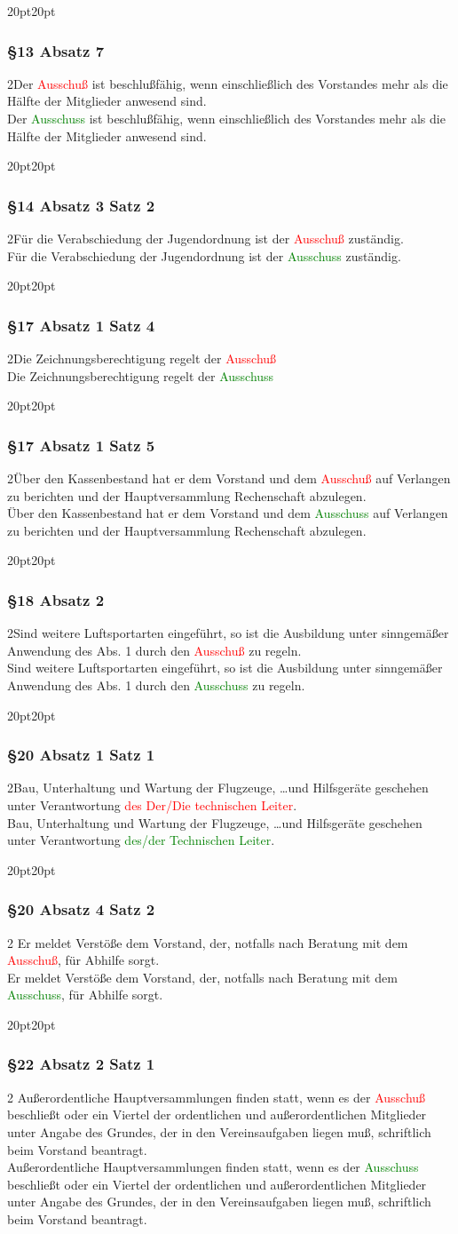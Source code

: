 \documentclass[10pt,a4paper,parskip=half]{scrartcl}
\newcommand{\new}[1]{\textcolor{Green}{#1}}
\newcommand{\old}[1]{\textcolor{Red}{#1}}
\newcommand{\change}[1]{
  \begin{adjustwidth}{20pt}{20pt}
    #1
  \end{adjustwidth}
}
\newcommand{\compare}[3]{\change{\subsubsection*{#1}\begin{multicols}{2}#2\columnbreak\\#3\end{multicols}}}
\begin{document}
\compare{§13 Absatz 7}
{Der \old{Ausschuß} ist beschlußfähig, wenn einschließlich des Vorstandes mehr als die Hälfte der Mitglieder anwesend sind.}
{Der \new{Ausschuss} ist beschlußfähig, wenn einschließlich des Vorstandes mehr als die Hälfte der Mitglieder anwesend sind.}

\compare{§14 Absatz 3 Satz 2}
{Für die Verabschiedung der Jugendordnung ist der \old{Ausschuß} zuständig.}
{Für die Verabschiedung der Jugendordnung ist der \new{Ausschuss} zuständig.}

\compare{§17 Absatz 1 Satz 4}{Die Zeichnungsberechtigung regelt der \old{Ausschuß}}{Die Zeichnungsberechtigung regelt der \new{Ausschuss}}
\compare{§17 Absatz 1 Satz 5}{Über den Kassenbestand hat er dem Vorstand und dem \old{Ausschuß} auf Verlangen zu berichten und der Hauptversammlung Rechenschaft abzulegen.}{Über den Kassenbestand hat er dem Vorstand und dem \new{Ausschuss} auf Verlangen zu berichten und der Hauptversammlung Rechenschaft abzulegen.}

\compare{§18 Absatz 2}{Sind weitere Luftsportarten eingeführt, so ist die Ausbildung unter sinngemäßer Anwendung des
  Abs. 1 durch den \old{Ausschuß} zu regeln.}{Sind weitere Luftsportarten eingeführt, so ist die Ausbildung unter sinngemäßer Anwendung des
  Abs. 1 durch den \new{Ausschuss} zu regeln.}

\compare{§20 Absatz 1 Satz 1}
{Bau, Unterhaltung und Wartung der Flugzeuge, \dots und Hilfsgeräte geschehen unter Verantwortung \old{des Der/Die technischen Leiter}.}
{Bau, Unterhaltung und Wartung der Flugzeuge, \dots und Hilfsgeräte geschehen unter Verantwortung \new{des/der Technischen Leiter}.}

\compare{§20 Absatz 4 Satz 2}{
  Er meldet Verstöße dem Vorstand, der, notfalls nach Beratung mit dem \old{Ausschuß}, für Abhilfe sorgt.
}{
  Er meldet Verstöße dem Vorstand, der, notfalls nach Beratung mit dem \new{Ausschuss}, für Abhilfe sorgt.
}

\clearpage
\compare{§22 Absatz 2 Satz 1}
{
  Außerordentliche Hauptversammlungen finden statt,
  wenn es der \old{Ausschuß} beschließt oder ein Viertel der ordentlichen und außerordentlichen Mitglieder unter Angabe des Grundes,
  der in den Vereinsaufgaben liegen muß,
  schriftlich beim Vorstand beantragt.
}
{
  Außerordentliche Hauptversammlungen finden statt,
  wenn es der \new{Ausschuss} beschließt oder ein Viertel der ordentlichen und außerordentlichen Mitglieder unter Angabe des Grundes,
  der in den Vereinsaufgaben liegen muß,
  schriftlich beim Vorstand beantragt.
}
\end{document}
